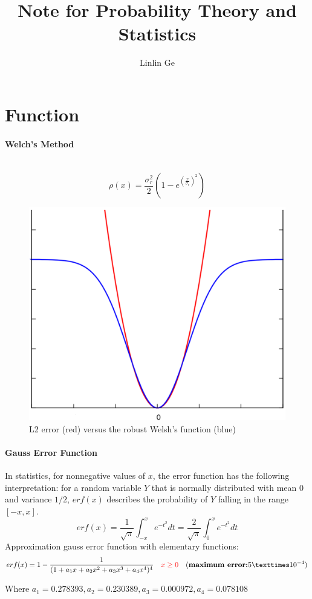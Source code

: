 \documentclass[10pt]{article}
\title{Note for Probability Theory and Statistics}
\author{Linlin Ge}
\begin{document}
\maketitle

\section{Function}
\paragraph{Welch's Method} \mbox{}\\
$$\rho(x)=\frac{\sigma_r^2}{2}(1-e^{(\frac{x}{\sigma_r})^2})$$
\begin{figure}[H]
\begin{center}
\includegraphics[scale=0.3]{images/WarchMethods.png}
\caption{L2 error (red) versus the robust Welsh's function (blue)}
\end{center}
\end{figure}


\paragraph{Gauss Error Function} \mbox{}
\par In statistics, for nonnegative values of $x$, the error function has the following interpretation: for a random variable $Y$ that is normally distributed with mean $0$ and variance $1/2$, $erf(x)$ describes the probability of $Y$ falling in the range $[-x, x]$.
\begin{equation}
erf(x)=\frac{1}{\sqrt{\pi}} \int_{-x}^{x} e^{-t^2} dt = \frac{2}{\sqrt{\pi}} \int_0^{x} e^{-t^2}dt
\end{equation}
Approximation gauss error function with elementary functions:
\begin{equation}
erf(x)=1-\frac{1}{(1+a_1x+a_2x^2+a_3x^3+a_4x^4)^4} \hspace{10pt} {\color{red}x \geq 0} \hspace{10pt} (\textbf{maximum error:} 5×10^{-4})
\end{equation}
\par Where $a_1=0.278393, a_2=0.230389, a_3=0.000972, a_4=0.078108$
\end{document}
